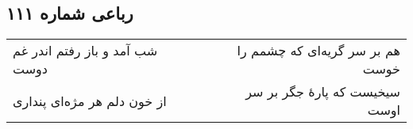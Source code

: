 \begin{center}
\section*{رباعی شماره ۱۱۱}
\label{sec:sh111}
\begin{longtable}{l p{0.5cm} r}
شب آمد و باز رفتم اندر غم دوست
&&
هم بر سر گریه‌ای که چشمم را خوست
\\
از خون دلم هر مژه‌ای پنداری
&&
سیخیست که پارهٔ جگر بر سر اوست
\\
\end{longtable}
\end{center}
